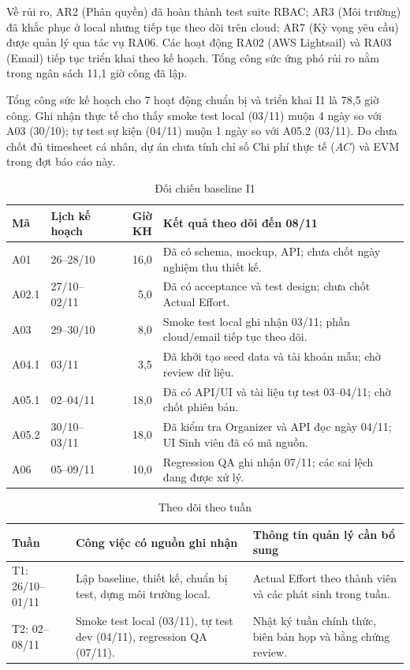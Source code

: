 Về rủi ro, AR2 (Phân quyền) đã hoàn thành test suite RBAC; AR3 (Môi trường) đã khắc phục ở local nhưng tiếp tục theo dõi trên cloud; AR7 (Kỳ vọng yêu cầu) được quản lý qua tác vụ RA06. Các hoạt động RA02 (AWS Lightsail) và RA03 (Email) tiếp tục triển khai theo kế hoạch. Tổng công sức ứng phó rủi ro nằm trong ngân sách 11,1 giờ công đã lập.


Tổng công sức kế hoạch cho 7 hoạt động chuẩn bị và triển khai I1 là 78,5 giờ công. Ghi nhận thực tế cho thấy smoke test local (03/11) muộn 4 ngày so với A03 (30/10); tự test sự kiện (04/11) muộn 1 ngày so với A05.2 (03/11). Do chưa chốt đủ timesheet cá nhân, dự án chưa tính chỉ số Chi phí thực tế ($AC$) và EVM trong đợt báo cáo này.

\begin{table}[H]
\centering\small
\caption{Đối chiếu baseline I1}\label{tab:i1-actual}
\begin{tabularx}{\linewidth}{@{}p{.08\linewidth}p{.16\linewidth}rX@{}}
\toprule
\textbf{Mã} & \textbf{Lịch kế hoạch} & \textbf{Giờ KH} & \textbf{Kết quả theo dõi đến 08/11}\\\midrule
A01 & 26--28/10 & 16,0 & Đã có schema, mockup, API; chưa chốt ngày nghiệm thu thiết kế.\\
A02.1 & 27/10--02/11 & 5,0 & Đã có acceptance và test design; chưa chốt Actual Effort.\\
A03 & 29--30/10 & 8,0 & Smoke test local ghi nhận 03/11; phần cloud/email tiếp tục theo dõi.\\
A04.1 & 03/11 & 3,5 & Đã khởi tạo seed data và tài khoản mẫu; chờ review dữ liệu.\\
A05.1 & 02--04/11 & 18,0 & Đã có API/UI và tài liệu tự test 03--04/11; chờ chốt phiên bản.\\
A05.2 & 30/10--03/11 & 18,0 & Đã kiểm tra Organizer và API đọc ngày 04/11; UI Sinh viên đã có mã nguồn.\\
A06 & 05--09/11 & 10,0 & Regression QA ghi nhận 07/11; các sai lệch đang được xử lý.\\
\bottomrule
\end{tabularx}
\end{table}

\begin{table}[H]
\centering\small
\caption{Theo dõi theo tuần}\label{tab:i1-weekly}
\begin{tabularx}{\linewidth}{@{}p{.14\linewidth}XX@{}}
\toprule
\textbf{Tuần} & \textbf{Công việc có nguồn ghi nhận} & \textbf{Thông tin quản lý cần bổ sung}\\\midrule
T1: 26/10--01/11 & Lập baseline, thiết kế, chuẩn bị test, dựng môi trường local. & Actual Effort theo thành viên và các phát sinh trong tuần.\\
T2: 02--08/11 & Smoke test local (03/11), tự test dev (04/11), regression QA (07/11). & Nhật ký tuần chính thức, biên bản họp và bằng chứng review.\\
\bottomrule
\end{tabularx}
\end{table}

